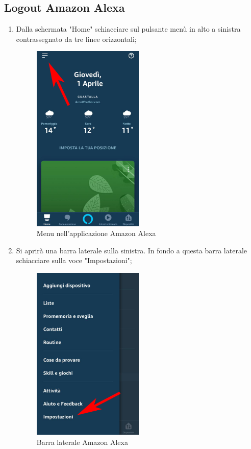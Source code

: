 \subsection{Logout Amazon Alexa}
\begin{enumerate}
\item Dalla schermata "Home" schiacciare sul pulsante menù in alto a sinistra contrassegnato da tre linee orizzontali;

\begin{figure}[H]
	\centering
	\includegraphics[width=0.5\textwidth]{images/MenuAlexa.png}
	\caption{Menu nell'applicazione Amazon Alexa}
\end{figure}

\newpage
\item Si aprirà una barra laterale sulla sinistra. In fondo a questa barra laterale schiacciare sulla voce "Impostazioni";

\begin{figure}[H]
	\centering
	\includegraphics[width=0.5\textwidth]{images/ImpostazioniAlexa.png}
	\caption{Barra laterale Amazon Alexa}
\end{figure}


\end{enumerate}
